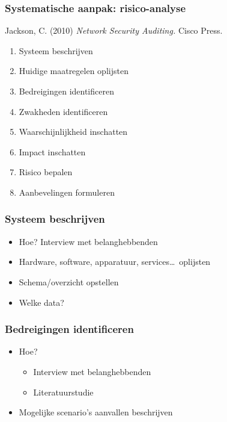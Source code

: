 \documentclass[aspectratio=169]{beamer}
\begin{document}
\begin{frame}
  \frametitle{Systematische aanpak: risico-analyse}

  Jackson, C. (2010) \textit{Network Security Auditing.} Cisco Press.

  \begin{enumerate}
    \item Systeem beschrijven
    \item Huidige maatregelen oplijsten
    \item Bedreigingen identificeren
    \item Zwakheden identificeren
    \item Waarschijnlijkheid inschatten
    \item Impact inschatten
    \item Risico bepalen
    \item Aanbevelingen formuleren
  \end{enumerate}

\end{frame}

\begin{frame}
  \frametitle{Systeem beschrijven}

  \begin{itemize}
    \item Hoe? Interview met belanghebbenden
    \item Hardware, software, apparatuur, services\ldots~oplijsten
    \item Schema/overzicht opstellen
    \item Welke data?
  \end{itemize}

\end{frame}

\begin{frame}
  \frametitle{Bedreigingen identificeren}

  \begin{itemize}
    \item Hoe?
          \begin{itemize}
            \item Interview met belanghebbenden
            \item Literatuurstudie
          \end{itemize}
    \item Mogelijke scenario's aanvallen beschrijven
  \end{itemize}

\end{frame}
\end{document}
